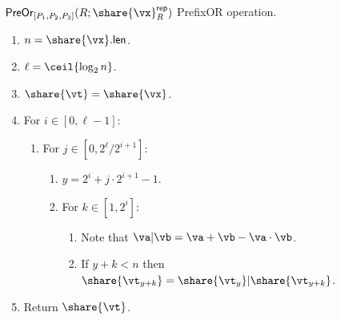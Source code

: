 \msubsubsection
  {$\mathsf{PreOr}_{[P_1, P_2, P_3]}(R; \share{\vx}^\mathsf{rep}_R)$}
  PrefixOR operation.
  \begin{enumerate}
    \item $n = \share{\vx}.\mathsf{len}$.
    \item $\ell = \ceil{\log_2{n}}$.
    \item $\share{\vt} = \share{\vx}$.
    \item For $i \in [0, \ell-1]$:
    \begin{enumerate}
      \item For $j \in [0, 2^\ell/2^{i+1}]$:
      \begin{enumerate}
        \item $y = 2^i + j \cdot 2^{i+1} - 1$.
        \item For $k \in [1, 2^i]$:
        \begin{enumerate}
            \item Note that $\va | \vb = \va + \vb - \va \cdot \vb$.
            \item If $y + k < n$ then $\share{\vt_{y+k}} = \share{\vt_y} | \share{\vt_{y + k}}$.
        \end{enumerate}
      \end{enumerate}
    \end{enumerate}
    \item Return $\share{\vt}$.
\end{enumerate}

